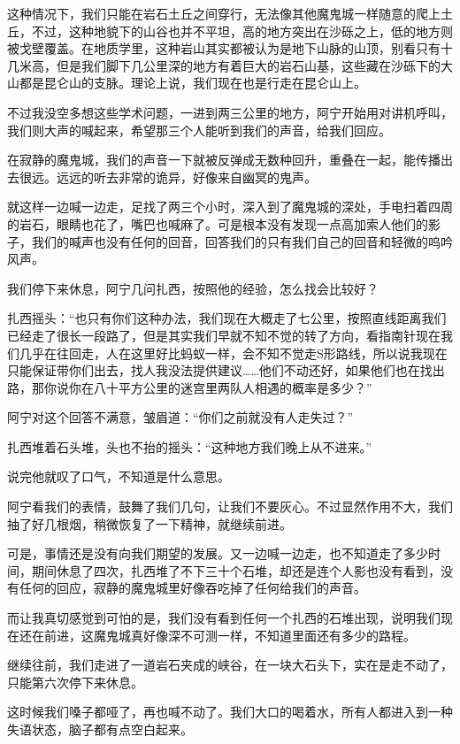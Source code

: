 这种情况下，我们只能在岩石土丘之间穿行，无法像其他魔鬼城一样随意的爬上土丘，不过，这种地貌下的山谷也并不平坦，高的地方突出在沙砾之上，低的地方则被戈壁覆盖。在地质学里，这种岩山其实都被认为是地下山脉的山顶，别看只有十几米高，但是我们脚下几公里深的地方有着巨大的岩石山基，这些藏在沙砾下的大山都是昆仑山的支脉。理论上说，我们现在也是行走在昆仑山上。

不过我没空多想这些学术问题，一进到两三公里的地方，阿宁开始用对讲机呼叫，我们则大声的喊起来，希望那三个人能听到我们的声音，给我们回应。

在寂静的魔鬼城，我们的声音一下就被反弹成无数种回升，重叠在一起，能传播出去很远。远远的听去非常的诡异，好像来自幽冥的鬼声。

就这样一边喊一边走，足找了两三个小时，深入到了魔鬼城的深处，手电扫着四周的岩石，眼睛也花了，嘴巴也喊麻了。可是根本没有发现一点高加索人他们的影子，我们的喊声也没有任何的回音，回答我们的只有我们自己的回音和轻微的呜吟风声。

我们停下来休息，阿宁几问扎西，按照他的经验，怎么找会比较好？

扎西摇头：“也只有你们这种办法，我们现在大概走了七公里，按照直线距离我们已经走了很长一段路了，但是其实我们早就不知不觉的转了方向，看指南针现在我们几乎在往回走，人在这里好比蚂蚁一样，会不知不觉走S形路线，所以说我现在只能保证带你们出去，找人我没法提供建议……他们不动还好，如果他们也在找出路，那你说你在八十平方公里的迷宫里两队人相遇的概率是多少？”

阿宁对这个回答不满意，皱眉道：“你们之前就没有人走失过？”

扎西堆着石头堆，头也不抬的摇头：“这种地方我们晚上从不进来。”

说完他就叹了口气，不知道是什么意思。

阿宁看我们的表情，鼓舞了我们几句，让我们不要灰心。不过显然作用不大，我们抽了好几根烟，稍微恢复了一下精神，就继续前进。

可是，事情还是没有向我们期望的发展。又一边喊一边走，也不知道走了多少时间，期间休息了四次，扎西堆了不下三十个石堆，却还是连个人影也没有看到，没有任何的回应，寂静的魔鬼城里好像吞吃掉了任何给我们的声音。

而让我真切感觉到可怕的是，我们没有看到任何一个扎西的石堆出现，说明我们现在还在前进，这魔鬼城真好像深不可测一样，不知道里面还有多少的路程。

继续往前，我们走进了一道岩石夹成的峡谷，在一块大石头下，实在是走不动了，只能第六次停下来休息。

这时候我们嗓子都哑了，再也喊不动了。我们大口的喝着水，所有人都进入到一种失语状态，脑子都有点空白起来。

